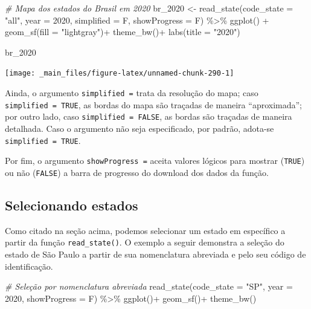 \documentclass[
  brazilian,
]{book}
\newenvironment{Shaded}{\begin{snugshade}}{\end{snugshade}}
\newcommand{\AttributeTok}[1]{\textcolor[rgb]{0.77,0.63,0.00}{#1}}
\newcommand{\CommentTok}[1]{\textcolor[rgb]{0.56,0.35,0.01}{\textit{#1}}}
\newcommand{\DecValTok}[1]{\textcolor[rgb]{0.00,0.00,0.81}{#1}}
\newcommand{\FunctionTok}[1]{\textcolor[rgb]{0.00,0.00,0.00}{#1}}
\newcommand{\NormalTok}[1]{#1}
\newcommand{\OtherTok}[1]{\textcolor[rgb]{0.56,0.35,0.01}{#1}}
\newcommand{\SpecialCharTok}[1]{\textcolor[rgb]{0.00,0.00,0.00}{#1}}
\newcommand{\StringTok}[1]{\textcolor[rgb]{0.31,0.60,0.02}{#1}}
\begin{document}
\begin{Shaded}
\begin{Highlighting}[]
\CommentTok{\# Mapa dos estados do Brasil em 2020}
\NormalTok{br\_2020 }\OtherTok{\textless{}{-}} \FunctionTok{read\_state}\NormalTok{(}\AttributeTok{code\_state =} \StringTok{"all"}\NormalTok{,}
                      \AttributeTok{year =} \DecValTok{2020}\NormalTok{,}
                      \AttributeTok{simplified =}\NormalTok{ F,}
                      \AttributeTok{showProgress =}\NormalTok{ F) }\SpecialCharTok{\%\textgreater{}\%}
  \FunctionTok{ggplot}\NormalTok{() }\SpecialCharTok{+} 
  \FunctionTok{geom\_sf}\NormalTok{(}\AttributeTok{fill =} \StringTok{"lightgray"}\NormalTok{)}\SpecialCharTok{+}
  \FunctionTok{theme\_bw}\NormalTok{()}\SpecialCharTok{+}
  \FunctionTok{labs}\NormalTok{(}\AttributeTok{title =} \StringTok{"2020"}\NormalTok{)}

\NormalTok{br\_2020}
\end{Highlighting}
\end{Shaded}

\begin{center}\texttt{[image: \_main\_files/figure-latex/unnamed-chunk-290-1]} \end{center}

Ainda, o argumento \texttt{simplified\ =} trata da resolução do mapa; caso \texttt{simplified\ =\ TRUE}, as bordas do mapa são traçadas de maneira ``aproximada''; por outro lado, caso \texttt{simplified\ =\ FALSE}, as bordas são traçadas de maneira detalhada. Caso o argumento não seja especificado, por padrão, adota-se \texttt{simplified\ =\ TRUE}.

Por fim, o argumento \texttt{showProgress\ =} aceita valores lógicos para mostrar (\texttt{TRUE}) ou não (\texttt{FALSE}) a barra de progresso do download dos dados da função.

\hypertarget{estad}{%
\subsection{Selecionando estados}\label{estad}}

Como citado na seção acima, podemos selecionar um estado em específico a partir da função \texttt{read\_state()}. O exemplo a seguir demonstra a seleção do estado de São Paulo a partir de sua nomenclatura abreviada e pelo seu código de identificação.

\begin{Shaded}
\begin{Highlighting}[]
\CommentTok{\# Seleção por nomenclatura abreviada}
\FunctionTok{read\_state}\NormalTok{(}\AttributeTok{code\_state =} \StringTok{"SP"}\NormalTok{,}
           \AttributeTok{year =} \DecValTok{2020}\NormalTok{,}
           \AttributeTok{showProgress =}\NormalTok{ F) }\SpecialCharTok{\%\textgreater{}\%} 
  \FunctionTok{ggplot}\NormalTok{()}\SpecialCharTok{+}
  \FunctionTok{geom\_sf}\NormalTok{()}\SpecialCharTok{+}
  \FunctionTok{theme\_bw}\NormalTok{()}
\end{Highlighting}
\end{Shaded}
\end{document}
